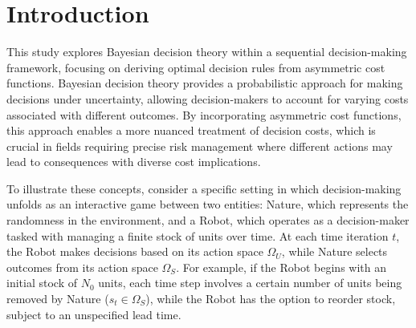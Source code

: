 
\section{Introduction}
This study explores Bayesian decision theory within a sequential decision-making framework, focusing on deriving optimal decision rules from asymmetric cost functions. Bayesian decision theory provides a probabilistic approach for making decisions under uncertainty, allowing decision-makers to account for varying costs associated with different outcomes. By incorporating asymmetric cost functions, this approach enables a more nuanced treatment of decision costs, which is crucial in fields requiring precise risk management where different actions may lead to consequences with diverse cost implications.

To illustrate these concepts, consider a specific setting in which decision-making unfolds as an interactive game between two entities: Nature, which represents the randomness in the environment, and a Robot, which operates as a decision-maker tasked with managing a finite stock of units over time. At each time iteration $t$, the Robot makes decisions based on its action space $\Omega_U$, while Nature selects outcomes from its action space $\Omega_S$. For example, if the Robot begins with an initial stock of $N_0$ units, each time step involves a certain number of units being removed by Nature ($s_t \in \Omega_S$), while the Robot has the option to reorder stock, subject to an unspecified lead time.


